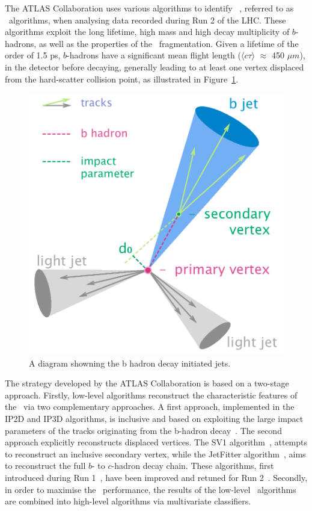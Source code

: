 

The ATLAS Collaboration uses various algorithms to identify 
\bjets~\cite{PERF-2012-04}, referred to as \btagging\ algorithms, 
when analysing data recorded during Run 2 of the LHC. These 
algorithms exploit the long lifetime, high mass and high decay 
multiplicity of $b$-hadrons, as well as the properties of the \bquark\  
fragmentation. Given a lifetime of the order of 1.5 ps, $b$-hadrons have a 
significant mean flight length ($\langle c\tau \rangle$ $\approx$ 450 $\mu m$), 
in the detector before decaying, generally leading to at least one vertex 
displaced from the hard-scatter collision point, as illustrated in Figure~\ref{fig:b-jet-decay}.

\begin{figure}[bth]
	\begin{centering}	
	\includegraphics[width=.6\textwidth]{FTAG_plots/B-tagging_diagram.png}
	\caption{A diagram showning the b hadron decay initiated jets. }
	\label{fig:b-jet-decay}
	\end{centering}
\end{figure}


The strategy developed by the ATLAS Collaboration is based on a two-stage approach. 
Firstly, low-level algorithms reconstruct the characteristic features of 
the \bjets\ via two complementary approaches. 
A first approach, 
implemented in the IP2D and IP3D algorithms, 
is inclusive and based
on exploiting the large impact parameters of the tracks 
originating from the b-hadron decay~\cite{ATL-PHYS-PUB-2017-013}.
The second approach explicitly reconstructs displaced vertices. 
The SV1 algorithm~\cite{ATL-PHYS-PUB-2017-011}, 
attempts to reconstruct 
an inclusive secondary vertex,
while the JetFitter algorithm~\cite{ATL-PHYS-PUB-2018-025}, 
aims to reconstruct the full $b$- to $c$-hadron decay chain.
These algorithms, first introduced during Run 1~\cite{PERF-2012-04}, 
have been improved and retuned for Run 2~\cite{FTAG-2018-01}. 
Secondly, in order to 
maximise the \btagging\ performance, the results of the low-level 
\btagging\ algorithms are combined into high-level algorithms 
via multivariate classifiers. 

